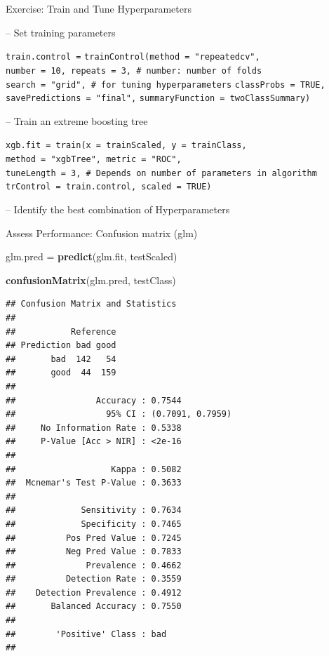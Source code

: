 \documentclass[ignorenonframetext,]{beamer}
\newenvironment{Shaded}{\begin{snugshade}}{\end{snugshade}}
\newcommand{\KeywordTok}[1]{\textcolor[rgb]{0.13,0.29,0.53}{\textbf{#1}}}
\newcommand{\StringTok}[1]{\textcolor[rgb]{0.31,0.60,0.02}{#1}}
\newcommand{\NormalTok}[1]{#1}
\begin{document}
\begin{frame}[fragile]{Exercise: Train and Tune Hyperparameters}

-- Set training parameters

\texttt{train.control\ =} \texttt{trainControl(method\ =\ "repeatedcv",}
\texttt{number\ =\ 10,\ repeats\ =\ 3,\ \#\ number:\ number\ of\ folds}
\texttt{search\ =\ "grid",\ \#\ for\ tuning\ hyperparameters}
\texttt{classProbs\ =\ TRUE,} \texttt{savePredictions\ =\ "final",}
\texttt{summaryFunction\ =\ twoClassSummary)}

-- Train an extreme boosting tree

\texttt{xgb.fit\ =\ train(x\ =\ trainScaled,\ y\ =\ trainClass,}
\texttt{method\ =\ "xgbTree",\ metric\ =\ "ROC",}
\texttt{tuneLength\ =\ 3,\ \#\ Depends\ on\ number\ of\ parameters\ in\ algorithm}
\texttt{trControl\ =\ train.control,\ scaled\ =\ TRUE)}

-- Identify the best combination of Hyperparameters

\end{frame}

\begin{frame}[fragile]{Assess Performance: Confusion matrix (glm)}

\begin{Shaded}
\begin{Highlighting}[]
\NormalTok{glm.pred =}\StringTok{ }\KeywordTok{predict}\NormalTok{(glm.fit, testScaled)}

\KeywordTok{confusionMatrix}\NormalTok{(glm.pred, testClass)}
\end{Highlighting}
\end{Shaded}

\begin{verbatim}
## Confusion Matrix and Statistics
## 
##           Reference
## Prediction bad good
##       bad  142   54
##       good  44  159
##                                           
##                Accuracy : 0.7544          
##                  95% CI : (0.7091, 0.7959)
##     No Information Rate : 0.5338          
##     P-Value [Acc > NIR] : <2e-16          
##                                           
##                   Kappa : 0.5082          
##  Mcnemar's Test P-Value : 0.3633          
##                                           
##             Sensitivity : 0.7634          
##             Specificity : 0.7465          
##          Pos Pred Value : 0.7245          
##          Neg Pred Value : 0.7833          
##              Prevalence : 0.4662          
##          Detection Rate : 0.3559          
##    Detection Prevalence : 0.4912          
##       Balanced Accuracy : 0.7550          
##                                           
##        'Positive' Class : bad             
## 
\end{verbatim}

\end{frame}
\end{document}
